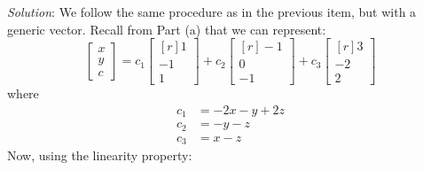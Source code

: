 \documentclass[12pt]{article}
\begin{document}
\emph{Solution}:
We follow the same procedure as in the previous item, but with a generic vector. Recall from Part (a) that we can represent:
\[
\begin{bmatrix}x\\y\\c\end{bmatrix}=
c_1\begin{bmatrix*}[r] 1\\ -1\\ 1\end{bmatrix*}+
c_2\begin{bmatrix*}[r] -1\\ 0\\-1\end{bmatrix*}+
c_3\begin{bmatrix*}[r] 3\\ -2\\ 2\end{bmatrix*}
\]
where
\begin{align*}
c_1&=- 2 x - y + 2 z\\
c_2&=- y - z\\
c_3&= x - z
\end{align*}
Now, using the linearity property:
\end{document}
